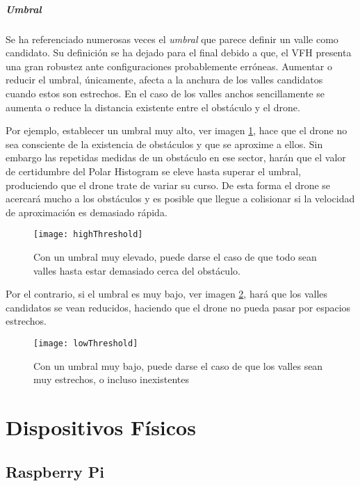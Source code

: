 \subparagraph{Umbral}
Se ha referenciado numerosas veces el \textit{umbral} que parece definir un valle como candidato. Su definición se ha dejado para el final debido a que, el VFH presenta una gran robustez ante configuraciones probablemente erróneas. Aumentar o reducir el umbral, únicamente, afecta a la anchura de los valles candidatos cuando estos son estrechos. En el caso de los valles anchos sencillamente se aumenta o reduce la distancia existente entre el obstáculo y el drone.

Por ejemplo, establecer un umbral muy alto, ver imagen \ref{fig:highThreshold}, hace que el drone no sea consciente de la existencia de obstáculos y que se aproxime a ellos. Sin embargo las repetidas medidas de un obstáculo en ese sector, harán que el valor de certidumbre del Polar Histogram se eleve hasta superar el umbral, produciendo que el drone trate de variar su curso. De esta forma el drone se acercará mucho a los obstáculos y es posible que llegue a colisionar si la velocidad de aproximación es demasiado rápida. 
 \begin{figure}[H]
	\centering
	\texttt{[image: highThreshold]}
	\caption{Con un umbral muy elevado, puede darse el caso de que todo sean valles hasta estar demasiado cerca del obstáculo.}\label{fig:highThreshold}
\end{figure}

Por el contrario, si el umbral es muy bajo, ver imagen \ref{fig:lowThreshold}, hará que los valles candidatos se vean reducidos, haciendo que el drone no pueda pasar por espacios estrechos.
 \begin{figure}[H]
	\centering
	\texttt{[image: lowThreshold]}
	\caption{Con un umbral muy bajo, puede darse el caso de que los valles sean muy estrechos, o incluso inexistentes}\label{fig:lowThreshold}
\end{figure}

\section{Dispositivos Físicos}

\subsection{Raspberry Pi}

